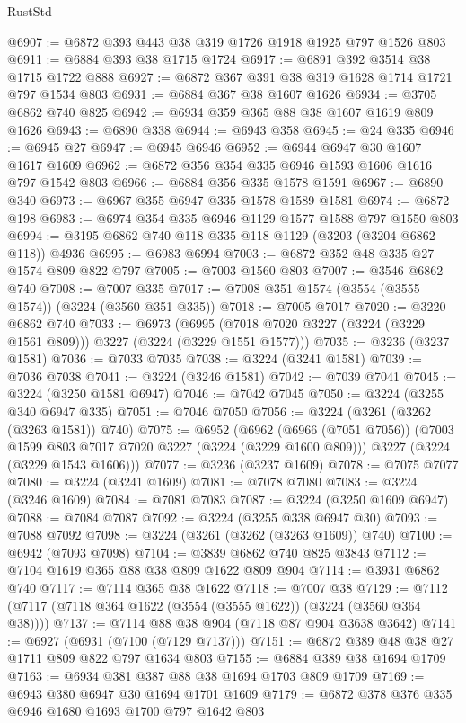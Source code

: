 \begin{lexlean}{RustStd}
\begin{coremodule}
@6907 := @6872 @393 @443 @38 @319 @1726 @1918 @1925 @797 @1526 @803
@6911 := @6884 @393 @38 @1715 @1724
@6917 := @6891 @392 @3514 @38 @1715 @1722 @888
@6927 := @6872 @367 @391 @38 @319 @1628 @1714 @1721 @797 @1534 @803
@6931 := @6884 @367 @38 @1607 @1626
@6934 := @3705 @6862 @740 @825
@6942 := @6934 @359 @365 @88 @38 @1607 @1619 @809 @1626
@6943 := @6890 @338
@6944 := @6943 @358
@6945 := @24 @335
@6946 := @6945 @27
@6947 := @6945 @6946
@6952 := @6944 @6947 @30 @1607 @1617 @1609
@6962 := @6872 @356 @354 @335 @6946 @1593 @1606 @1616 @797 @1542 @803
@6966 := @6884 @356 @335 @1578 @1591
@6967 := @6890 @340
@6973 := @6967 @355 @6947 @335 @1578 @1589 @1581
@6974 := @6872 @198
@6983 := @6974 @354 @335 @6946 @1129 @1577 @1588 @797 @1550 @803
@6994 := @3195 @6862 @740 @118 @335 @118 @1129 (@3203 (@3204 @6862 @118)) @4936
@6995 := @6983 @6994
@7003 := @6872 @352 @48 @335 @27 @1574 @809 @822 @797
@7005 := @7003 @1560 @803
@7007 := @3546 @6862 @740
@7008 := @7007 @335
@7017 := @7008 @351 @1574 (@3554 (@3555 @1574)) (@3224 (@3560 @351 @335))
@7018 := @7005 @7017
@7020 := @3220 @6862 @740
@7033 := @6973
    (@6995 (@7018 @7020 @3227 (@3224 (@3229 @1561 @809))) @3227 (@3224 (@3229 @1551 @1577)))
@7035 := @3236 (@3237 @1581)
@7036 := @7033 @7035
@7038 := @3224 (@3241 @1581)
@7039 := @7036 @7038
@7041 := @3224 (@3246 @1581)
@7042 := @7039 @7041
@7045 := @3224 (@3250 @1581 @6947)
@7046 := @7042 @7045
@7050 := @3224 (@3255 @340 @6947 @335)
@7051 := @7046 @7050
@7056 := @3224 (@3261 (@3262 (@3263 @1581)) @740)
@7075 := @6952
    (@6962
      (@6966 (@7051 @7056))
      (@7003 @1599 @803 @7017 @7020 @3227 (@3224 (@3229 @1600 @809)))
      @3227
      (@3224 (@3229 @1543 @1606)))
@7077 := @3236 (@3237 @1609)
@7078 := @7075 @7077
@7080 := @3224 (@3241 @1609)
@7081 := @7078 @7080
@7083 := @3224 (@3246 @1609)
@7084 := @7081 @7083
@7087 := @3224 (@3250 @1609 @6947)
@7088 := @7084 @7087
@7092 := @3224 (@3255 @338 @6947 @30)
@7093 := @7088 @7092
@7098 := @3224 (@3261 (@3262 (@3263 @1609)) @740)
@7100 := @6942 (@7093 @7098)
@7104 := @3839 @6862 @740 @825 @3843
@7112 := @7104 @1619 @365 @88 @38 @809 @1622 @809 @904
@7114 := @3931 @6862 @740
@7117 := @7114 @365 @38 @1622
@7118 := @7007 @38
@7129 := @7112 (@7117 (@7118 @364 @1622 (@3554 (@3555 @1622)) (@3224 (@3560 @364 @38))))
@7137 := @7114 @88 @38 @904 (@7118 @87 @904 @3638 @3642)
@7141 := @6927 (@6931 (@7100 (@7129 @7137)))
@7151 := @6872 @389 @48 @38 @27 @1711 @809 @822 @797 @1634 @803
@7155 := @6884 @389 @38 @1694 @1709
@7163 := @6934 @381 @387 @88 @38 @1694 @1703 @809 @1709
@7169 := @6943 @380 @6947 @30 @1694 @1701 @1609
@7179 := @6872 @378 @376 @335 @6946 @1680 @1693 @1700 @797 @1642 @803

\end{coremodule}
\end{lexlean}
